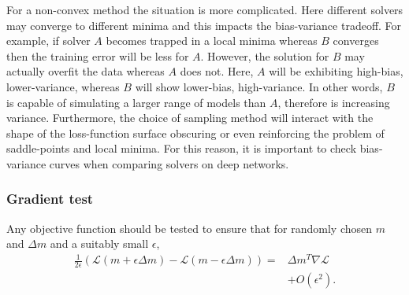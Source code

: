 \documentclass[11pt,twocolumn]{article}
\begin{document}
For a non-convex method the situation is more complicated. Here different solvers may converge to different minima and this impacts the bias-variance tradeoff. For example, if solver $A$ becomes trapped in a local minima whereas $B$ converges then the training error will be less for $A$. However, the solution for $B$ may actually overfit the data whereas $A$ does not. Here, $A$ will be exhibiting high-bias, lower-variance, whereas $B$ will show lower-bias, high-variance. In other words, $B$ is capable of simulating a larger range of models than $A$, therefore is increasing variance. Furthermore, the choice of sampling method will interact with the shape of the loss-function surface obscuring or even reinforcing the problem of saddle-points and local minima. For this reason, it is important to check bias-variance curves when comparing solvers on deep networks.
 
\subsubsection*{Gradient test}\label{grad_test}
Any objective function should be tested to ensure that for randomly chosen $m$ and $\Delta m$ and a suitably small $\epsilon$,
\begin{align}
\frac{1}{2 \epsilon}(\mathcal{L}(m+\epsilon \Delta m)-\mathcal{L}(m-\epsilon \Delta m))=&\Delta m^T \nabla \mathcal{L}\nonumber\\
 &+ O(\epsilon^2). 
\end{align}
 
\end{document}
